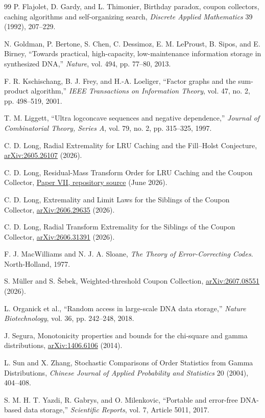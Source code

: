 \documentclass[11pt]{article}
\theoremstyle{definition}
\theoremstyle{remark}
\newcommand{\1}{\mathbf 1}
\begin{document}
\begin{thebibliography}{99}
 P. Flajolet, D. Gardy, and L. Thimonier,
Birthday paradox, coupon collectors, caching algorithms and self-organizing search,
\emph{Discrete Applied Mathematics} 39 (1992), 207--229.

N. Goldman, P. Bertone, S. Chen, C. Dessimoz, E. M. LeProust, B. Sipos, and E. Birney,
``Towards practical, high-capacity, low-maintenance information storage in synthesized DNA,''
\emph{Nature}, vol. 494, pp. 77--80, 2013.

F. R. Kschischang, B. J. Frey, and H.-A. Loeliger,
``Factor graphs and the sum-product algorithm,''
\emph{IEEE Transactions on Information Theory}, vol. 47, no. 2, pp. 498--519, 2001.

T. M. Liggett,
``Ultra logconcave sequences and negative dependence,''
\emph{Journal of Combinatorial Theory, Series A}, vol. 79, no. 2, pp. 315--325, 1997.

 C. D. Long,
Radial Extremality for LRU Caching and the Fill--Holst Conjecture,
\href{https://arxiv.org/abs/2605.26107}{arXiv:2605.26107} (2026).

 C. D. Long,
Residual-Mass Transform Order for LRU Caching and the Coupon Collector,
\href{https://github.com/long-mathematics/nonuniform-random-permutations/blob/main/papers/07-residual-mass-transform-order/residual-mass-transform-order.tex}{Paper VII, repository source} (June 2026).

 C. D. Long,
Extremality and Limit Laws for the Siblings of the Coupon Collector,
\href{https://arxiv.org/abs/2606.29635}{arXiv:2606.29635} (2026).

 C. D. Long,
Radial Transform Extremality for the Siblings of the Coupon Collector,
\href{https://arxiv.org/abs/2606.31391}{arXiv:2606.31391} (2026).

F. J. MacWilliams and N. J. A. Sloane,
\emph{The Theory of Error-Correcting Codes}.
North-Holland, 1977.

 S. M\"uller and S. \v Sebek,
Weighted-threshold Coupon Collection,
\href{https://arxiv.org/abs/2607.08551}{arXiv:2607.08551} (2026).

L. Organick et al.,
``Random access in large-scale DNA data storage,''
\emph{Nature Biotechnology}, vol. 36, pp. 242--248, 2018.

 J. Segura,
Monotonicity properties and bounds for the chi-square and gamma distributions,
\href{https://arxiv.org/abs/1406.6106}{arXiv:1406.6106} (2014).

 L. Sun and X. Zhang,
Stochastic Comparisons of Order Statistics from Gamma Distributions,
\emph{Chinese Journal of Applied Probability and Statistics} 20 (2004), 404--408.

S. M. H. T. Yazdi, R. Gabrys, and O. Milenkovic,
``Portable and error-free DNA-based data storage,''
\emph{Scientific Reports}, vol. 7, Article 5011, 2017.

\end{thebibliography}
\end{document}
